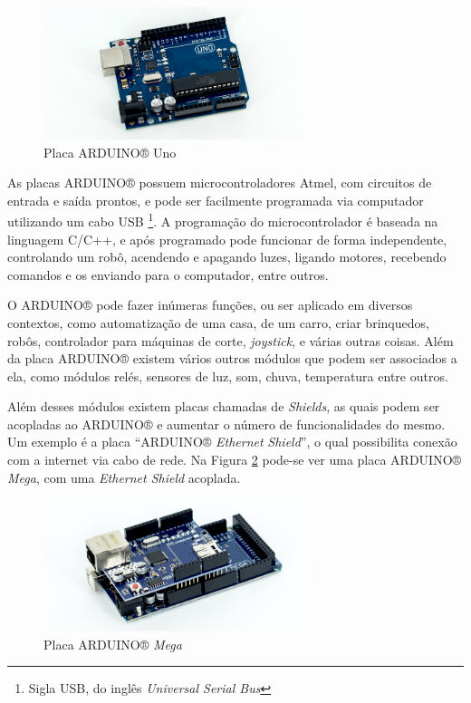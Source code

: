 \documentclass[
	12pt,			%
	openright,		%
	oneside,			%
	a4paper,			%
	chapter=TITLE,		%
	english,			%
	brazil,			%
	]{abntex2}
\begin{document}
\begin{figure}[H]
	\centering
		\includegraphics[width=0.7\textwidth]{./img/img-16.png}
		\caption{Placa ARDUINO® Uno}
		\label{img:img-16}
\end{figure}

As placas ARDUINO® possuem microcontroladores Atmel, com circuitos de entrada e saída prontos, e pode ser facilmente programada via computador utilizando um cabo USB \footnote{Sigla USB, do inglês \emph{Universal Serial Bus}}. A programação do microcontrolador é baseada na linguagem C/C++, e após programado pode funcionar de forma independente, controlando um robô, acendendo e apagando luzes, ligando motores, recebendo comandos e os enviando para o computador, entre outros.

O ARDUINO® pode fazer inúmeras funções, ou ser aplicado em diversos contextos, como automatização de uma casa, de um carro, criar brinquedos, robôs, controlador para máquinas de corte, \emph{joystick}, e várias outras coisas. Além da placa ARDUINO® existem vários outros módulos que podem ser associados a ela, como módulos relés, sensores de luz, som, chuva, temperatura entre outros.

Além desses módulos existem placas chamadas de \emph{Shields}, as quais podem ser acopladas ao ARDUINO® e aumentar o número de funcionalidades do mesmo. Um exemplo é a placa “ARDUINO® \emph{Ethernet} \emph{Shield}”, o qual possibilita conexão com a internet via cabo de rede. Na Figura \ref{img:img-15} pode-se ver uma placa ARDUINO® \emph{Mega}, com uma \emph{Ethernet Shield} acoplada.

\begin{figure}[H]
	\centering
		\includegraphics[width=0.7\textwidth]{./img/img-15.png}
		\caption{Placa ARDUINO® \emph{Mega}}
		\label{img:img-15}
\end{figure}
\end{document}

